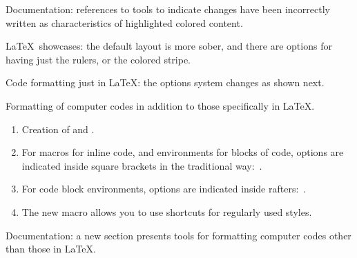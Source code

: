 \documentclass{tutodoc}
\begin{document}
\small

\begin{tdocfix}
	\item Documentation: references to tools to indicate changes have been incorrectly written as characteristics of highlighted colored content.
\end{tdocfix}


\begin{tdocbreak}
	\item \LaTeX\ showcases: the default layout is more sober, and there are options for having just the rulers, or the colored stripe.

	\item Code formatting just in \LaTeX: the options system changes as shown next.
\end{tdocbreak}


\begin{tdocnew}
	\item Formatting of computer codes in addition to those specifically in LaTeX.
	\begin{enumerate}
		\item Creation of  and .

		\item For macros for inline code, and environments for blocks of code,  options are indicated inside square brackets in the traditional way: \,.

		\item For code block environments,  options are indicated inside rafters: \,.

		\item The new macro  allows you to use shortcuts for regularly used  styles.
	\end{enumerate}

	\item Documentation: a new section presents tools for formatting computer codes other than those in LaTeX.
\end{tdocnew}
\end{document}
